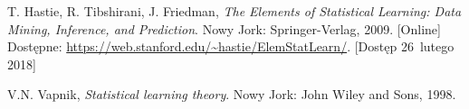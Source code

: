 \documentclass[11pt,a4paper]{article}
\begin{document}
\begin{thebibliography}{9}

        T. Hastie,
        R. Tibshirani,
        J. Friedman,
        \emph{The Elements of Statistical Learning: Data Mining, Inference, and Prediction}.
        Nowy Jork: Springer-Verlag,
        2009.
        [Online] \\
        Dostępne: \url{https://web.stanford.edu/~hastie/ElemStatLearn/}.
        [Dostęp 26~lutego 2018]

        V.N. Vapnik,
        \emph{Statistical learning theory}.
        Nowy Jork: John Wiley and Sons,
        1998.

\end{thebibliography}
\end{document}
